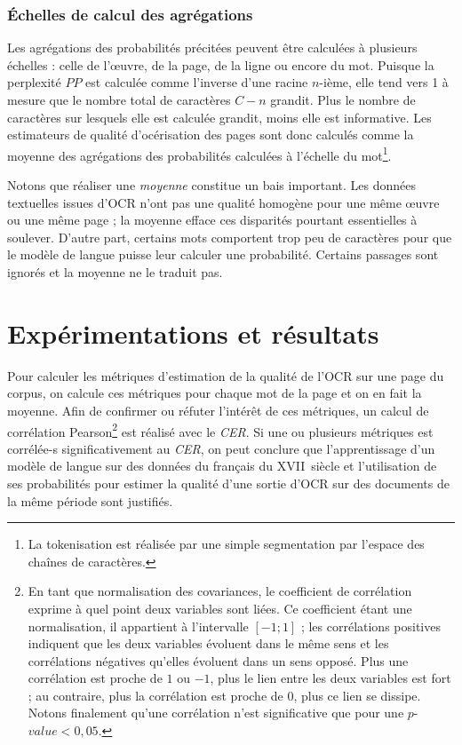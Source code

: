 \documentclass[10pt,twoside]{article}
\begin{document}
	    \subsubsection{\'{E}chelles de calcul des agrégations}\label{echelle}
	    Les agrégations des probabilités précitées peuvent être calculées à plusieurs échelles : celle de l'\oe{}uvre, de la page, de la ligne 
	    ou encore du mot. Puisque la perplexité $PP$ est calculée comme l'inverse d'une racine $n$-ième, elle tend vers 1 à mesure que le nombre 
	    total de caractères $C - n$ grandit. Plus le nombre de caractères sur lesquels elle est calculée grandit, moins elle est informative. 
	    Les estimateurs de qualité d'océrisation des pages sont donc calculés comme la moyenne des agrégations des probabilités
	    calculées à l'échelle du mot\footnote{La tokenisation est réalisée par une simple segmentation par l'espace des chaînes de caractères.}.

	    Notons que réaliser une \textit{moyenne} constitue un bais important. Les données textuelles issues d'OCR n'ont pas une qualité homogène
	    pour une même \oe{}uvre ou une même page ; la moyenne efface ces disparités pourtant essentielles à soulever. D'autre
	    part, certains mots comportent trop peu de caractères pour que le modèle de langue puisse leur calculer une probabilité. Certains passages sont 
	    ignorés et la moyenne ne le traduit pas. 


\section{Expérimentations et résultats}\label{expe}

Pour calculer les métriques d'estimation de la qualité de l'OCR sur une page du corpus, on calcule ces métriques pour chaque mot de la page
et on en fait la moyenne. Afin de confirmer ou réfuter l'intérêt de ces métriques, un calcul de corrélation 
Pearson\footnote{En tant que normalisation des covariances, le coefficient de corrélation exprime à quel point deux variables 
sont liées. Ce coefficient étant une normalisation, il appartient à l'intervalle $\left[-1;1\right]$ ; les corrélations 
positives indiquent que les deux variables évoluent dans le même sens et les corrélations négatives qu'elles évoluent dans un sens opposé. 
Plus une corrélation est proche de $1$ ou $-1$, plus le lien entre les deux variables est fort ; au
contraire, plus la corrélation est proche de $0$, plus ce lien se dissipe. Notons finalement qu'une corrélation n'est 
significative que pour une $p$-$value < 0,05$.}  
est réalisé avec le \textit{CER}. Si une ou plusieurs métriques est corrélée-s significativement au \textit{CER}, on peut
conclure que l'apprentissage d'un modèle de langue sur des données du français du XVII\ieme~siècle et l'utilisation de ses 
probabilités pour estimer la qualité d'une sortie d'OCR sur des documents de la même période sont justifiés.
\end{document}
